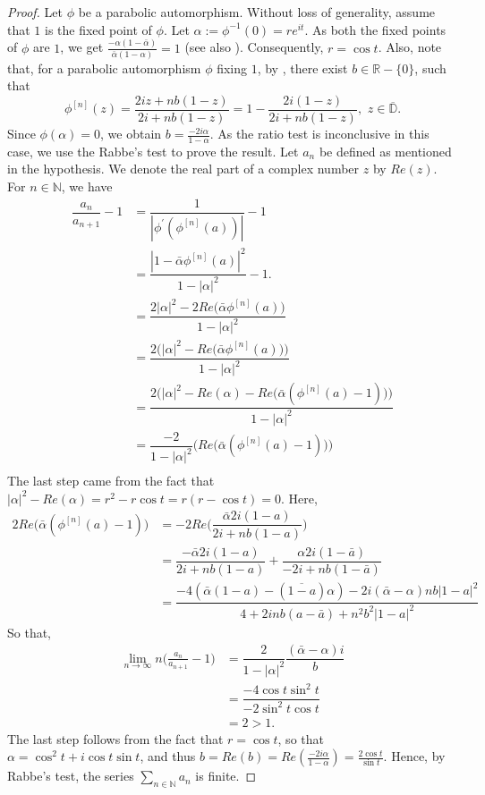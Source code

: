 \documentclass[12pt, reqno]{amsart}
\theoremstyle{definition}
\numberwithin{equation}{section}
\begin{document}
\begin{proof}
	Let $\phi$ be a parabolic automorphism.  Without loss of generality, assume that $1$ is the fixed point of $\phi$. Let $\alpha:=\phi^{-1}(0)=re^{it}$. As both the fixed points of $\phi$ are $1$, we get  $\frac{-\alpha(1-\bar{\alpha})}{\bar{\alpha}(1-\alpha)}=1$ (see also \cite[Page ~$78 - 79$]{modelsubspace}). Consequently, $r=\cos t$. Also, note that, for a parabolic automorphism $\phi$ fixing $1$, by \cite[Lemma 5.4.4]{texthardy}, there exist  $b \in \mathbb{R}-\{0\}$, such that 
	$$\phi^{[n]}(z)=\dfrac{2iz+nb(1-z)}{2i+nb(1-z)}= 1-\dfrac{2i(1-z)}{2i+nb(1-z)}, \,\, z \in \mathbb{\overline{D}}.$$
Since $\phi(\alpha)=0$, we obtain $b=\frac{-2i\alpha}{1-\alpha}$. As the ratio test is inconclusive in this case, we use the Rabbe's test to prove the result.
Let $a_n$ be defined as mentioned in the hypothesis. We denote the real part of a complex number $z$ by $Re(z)$.
For $n \in \mathbb{N}$, we have
\begin{equation*}
\begin{split}
	\dfrac{a_n}{a_{n+1}}-1&=\dfrac{1}{|\phi^{'}(\phi^{[n]}(a))|}-1\\
	&=\dfrac{|1-\bar{\alpha}\phi^{[n]}(a)|^2}{1-|\alpha|^2}-1.\\
	&=\dfrac{2|\alpha|^2-2Re{\Big(\bar{\alpha}\phi^{[n]}(a)\Big)}}{1-|\alpha|^2}\\
	&=\dfrac{2\Big(|\alpha|^2-Re{\Big({\bar{\alpha}}\phi^{[n]}(a)\Big)}\Big)}{1-|\alpha|^2}\\
	&=\dfrac{2\Big(|\alpha|^2-Re(\alpha)-Re{\Big({\bar{\alpha}}(\phi^{[n]}(a)-1)\Big)}\Big)}{1-|\alpha|^2}\\
	&=\dfrac{-2}{1-|\alpha|^2}\Big(Re{\Big({\bar{\alpha}}(\phi^{[n]}(a)-1)\Big)\Big)}\\
\end{split}
\end{equation*}
The last step came from the fact that $|\alpha|^2-Re(\alpha)=r^2-r\cos t=r(r-\cos t)=0$. Here, 
\begin{equation*}
\begin{split}
	2Re{\Big({\bar{\alpha}}(\phi^{[n]}(a)-1)\Big)}&=-2Re{\Big(\dfrac{{\bar{\alpha}}2i(1-a)}{2i+nb(1-a)}\Big)}\\
	&=\dfrac{{-\bar{\alpha}}2i(1-a)}{2i+nb(1-a)}+\dfrac{{\alpha}2i(1-\bar{a})}{-2i+nb(1-\bar{a})}\\
	&=\dfrac{-4(\bar{\alpha}(1-a)-(\overline{1-a})\alpha)-2i(\bar{\alpha}-\alpha)nb|1-a|^2}{4+2inb(a-\bar{a})+n^2b^2|1-a|^2}
\end{split}
\end{equation*}
So that, \begin{equation*}
\begin{split}
	\lim\limits_{n\rightarrow \infty}n\Big(\frac{a_n}{a_{n+1}}-1\Big)&=\dfrac{2}{1-|\alpha|^2}\dfrac{(\bar{\alpha}-\alpha)i}{b}\\
	&=\dfrac{-4\cos t\sin^{2} t}{-2\sin^{2} t\cos t}\\
	&=2>1.
\end{split}
\end{equation*}
The last step follows from the fact that $r=\cos t$, so that $\alpha=\cos^2 t+i\cos t\sin t$, and thus $b=Re(b)=Re(\frac{-2i\alpha}{1-\alpha})=\frac{2\cos t}{\sin t}.$
Hence, by Rabbe's test, the series $\sum_{n\in \mathbb{N}}a_n $ is finite. 


\end{proof}
\end{document}
